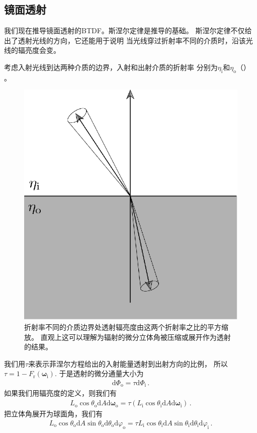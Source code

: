\subsection{镜面透射}\label{sub:镜面透射}
我们现在推导镜面透射的BTDF。斯涅尔定律是推导的基础。
斯涅尔定律不仅给出了透射光线的方向，它还能用于说明
当光线穿过折射率不同的介质时，沿该光线的辐亮度会变。

考虑入射光线到达两种介质的边界，入射和出射介质的折射率
分别为$\eta_{\mathrm{i}}$和$\eta_{\mathrm{o}}$（）
。
\begin{figure}[htbp]
    \centering
    \includegraphics[width=0.5\linewidth]{Pictures/chap08/Radiancechangeatrefraction.eps}
    \caption{折射率不同的介质边界处透射辐亮度由这两个折射率之比的平方缩放。
        直观上这可以理解为辐射的微分立体角被压缩或展开作为透射的结果。}
    \label{fig:8.9}
\end{figure}

我们用$\tau$来表示菲涅尔方程给出的入射能量透射到出射方向的比例，
所以$\tau=1-F_{\mathrm{r}}({\bm\omega}_{\mathrm{i}})$.
于是透射的微分通量大小为
\begin{align*}
    \mathrm{d}\varPhi_{\mathrm{o}}=\tau\mathrm{d}\varPhi_{\mathrm{i}}\, .
\end{align*}
如果我们用辐亮度的定义，则我们有
\begin{align*}
    L_{\mathrm{o}}\cos\theta_{\mathrm{o}}\mathrm{d}A\mathrm{d}{\bm\omega}_{\mathrm{o}}=\tau(L_{\mathrm{i}}\cos\theta_{\mathrm{i}}\mathrm{d}A\mathrm{d}{\bm\omega}_{\mathrm{i}})\, .
\end{align*}
把立体角展开为球面角，我们有
\begin{align}
    \label{eq:8.6}
    L_{\mathrm{o}}\cos\theta_{\mathrm{o}}\mathrm{d}A\sin\theta_{\mathrm{o}}\mathrm{d}\theta_{\mathrm{o}}\mathrm{d}\varphi_{\mathrm{o}}=\tau L_{\mathrm{i}}\cos\theta_{\mathrm{i}}\mathrm{d}A\sin\theta_{\mathrm{i}}\mathrm{d}\theta_{\mathrm{i}}\mathrm{d}\varphi_{\mathrm{i}}\, .
\end{align}

